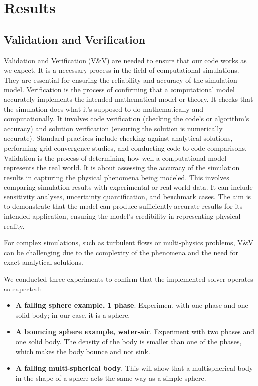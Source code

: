 \chapter{Results} \label{chap:results}
\section{Validation and Verification}
Validation and Verification (V\&V) are needed to ensure that our code works as we expect. It is a necessary process in the field of computational simulations. They are essential for ensuring the reliability and accuracy of the simulation model. Verification is the process of confirming that a computational model accurately implements the intended mathematical model or theory. It checks that the simulation does what it's supposed to do mathematically and computationally.
It involves code verification (checking the code's or algorithm's accuracy) and solution verification (ensuring the solution is numerically accurate). Standard practices include checking against analytical solutions, performing grid convergence studies, and conducting code-to-code comparisons. Validation is the process of determining how well a computational model represents the real world. It is about assessing the accuracy of the simulation results in capturing the physical phenomena being modeled. This involves comparing simulation results with experimental or real-world data. It can include sensitivity analyses, uncertainty quantification, and benchmark cases. The aim is to demonstrate that the model can produce sufficiently accurate results for its intended application, ensuring the model's credibility in representing physical reality.

For complex simulations, such as turbulent flows or multi-physics problems, V\&V can be challenging due to the complexity of the phenomena and the need for exact analytical solutions.

We conducted three experiments to confirm that the implemented solver operates as expected:
\begin{itemize}
    \item \textbf{A falling sphere example, 1 phase}. Experiment with one phase and one solid body; in our case, it is a sphere. 
    \item \textbf{A bouncing sphere example, water-air}. Experiment with two phases and one solid body. The density of the body is smaller than one of the phases, which makes the body bounce and not sink.
    \item \textbf{A falling multi-spherical body}. This will show that a multispherical body in the shape of a sphere acts the same way as a simple sphere.
\end{itemize}

